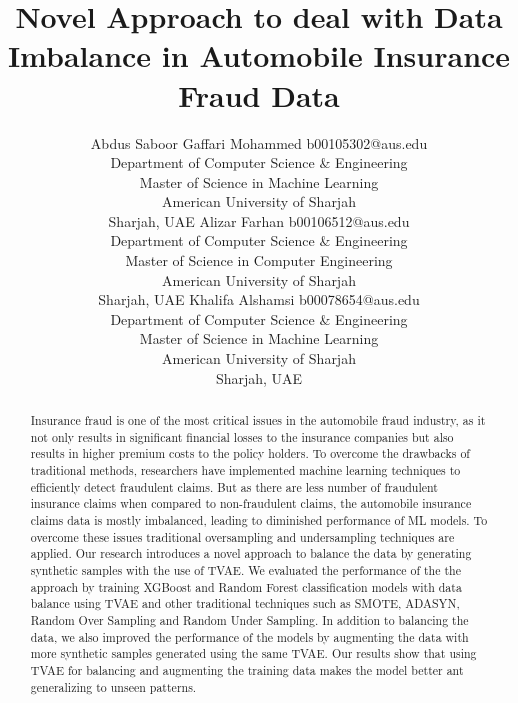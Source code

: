 \documentclass[twoside,11pt]{article}
\begin{document}
\title{Novel Approach to deal with Data Imbalance in Automobile Insurance Fraud Data}

\author{\name Abdus Saboor Gaffari Mohammed \email b00105302@aus.edu \\
        \addr Department of Computer Science \& Engineering\\
        Master of Science in Machine Learning\\
        American University of Sharjah\\
        Sharjah, UAE
        \AND
        \name Alizar Farhan \email b00106512@aus.edu \\
        \addr Department of Computer Science \& Engineering\\
        Master of Science in Computer Engineering\\
        American University of Sharjah\\
        Sharjah, UAE
        \AND
        \name Khalifa Alshamsi \email b00078654@aus.edu \\
        \addr Department of Computer Science \& Engineering\\
        Master of Science in Machine Learning\\
        American University of Sharjah\\
        Sharjah, UAE
       } 

\maketitle

\begin{abstract}%

Insurance fraud is one of the most critical issues in the automobile fraud industry, as it not only results in significant financial losses to the insurance companies but also results in higher premium costs to the policy holders. To overcome the drawbacks of traditional methods, researchers have implemented machine learning techniques to efficiently detect fraudulent claims. But as there are less number of fraudulent insurance claims when compared to non-fraudulent claims, the automobile insurance claims data is mostly imbalanced, leading to diminished performance of ML models. To overcome these issues traditional oversampling and undersampling techniques are applied. Our research introduces a novel approach to balance the data by generating synthetic samples with the use of TVAE. We evaluated the performance of the the approach by training XGBoost and Random Forest classification models with data balance using TVAE and other traditional techniques such as SMOTE, ADASYN, Random Over Sampling and Random Under Sampling. In addition to balancing the data, we also improved the performance of the models by augmenting the data with more synthetic samples generated using the same TVAE. Our results show that using TVAE for balancing and augmenting the training data makes the model better ant generalizing to unseen patterns.

\end{abstract}
\end{document}
